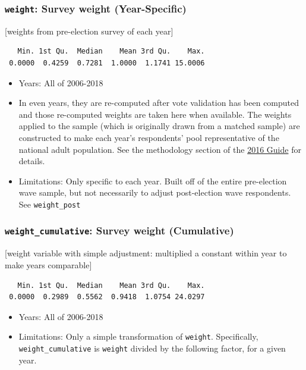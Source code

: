 \documentclass[10pt,article,oneside]{memoir}
\theoremstyle{definition}
\begin{document}
\subsubsection{\texorpdfstring{\texttt{weight}: Survey weight
(Year-Specific)}{weight: Survey weight (Year-Specific)}}\label{weight-survey-weight-year-specific}

{[}weights from pre-election survey of each year{]}

\begin{verbatim}
   Min. 1st Qu.  Median    Mean 3rd Qu.    Max. 
 0.0000  0.4259  0.7281  1.0000  1.1741 15.0006 
\end{verbatim}

\begin{itemize}
\tightlist
\item
  Years: All of 2006-2018
\item
  In even years, they are re-computed after vote validation has been
  computed and those re-computed weights are taken here when available.
  The weights applied to the sample (which is originally drawn from a
  matched sample) are constructed to make each year's respondents' pool
  representative of the national adult population. See the methodology
  section of the
  \href{https://dataverse.harvard.edu/api/access/datafile/3047286}{2016
  Guide} for details.
\item
  Limitations: Only specific to each year. Built off of the entire
  pre-election wave sample, but not necessarily to adjust post-election
  wave respondents. See \texttt{weight\_post}
\end{itemize}

\subsubsection{\texorpdfstring{\texttt{weight\_cumulative}: Survey
weight
(Cumulative)}{weight\_cumulative: Survey weight (Cumulative)}}\label{weight_cumulative-survey-weight-cumulative}

{[}weight variable with simple adjustment: multiplied a constant within
year to make years comparable{]}

\begin{verbatim}
   Min. 1st Qu.  Median    Mean 3rd Qu.    Max. 
 0.0000  0.2989  0.5562  0.9418  1.0754 24.0297 
\end{verbatim}

\begin{itemize}
\tightlist
\item
  Years: All of 2006-2018
\item
  Limitations: Only a simple transformation of \texttt{weight}.
  Specifically, \texttt{weight\_cumulative} is \texttt{weight} divided
  by the following factor, for a given year.
\end{itemize}
\end{document}
